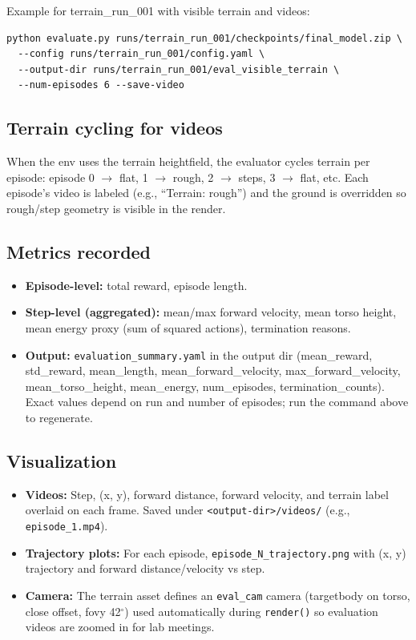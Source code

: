 \documentclass[11pt]{article}
\begin{document}
Example for terrain\_run\_001 with visible terrain and videos:

\begin{lstlisting}
python evaluate.py runs/terrain_run_001/checkpoints/final_model.zip \
  --config runs/terrain_run_001/config.yaml \
  --output-dir runs/terrain_run_001/eval_visible_terrain \
  --num-episodes 6 --save-video
\end{lstlisting}

\subsection{Terrain cycling for videos}

When the env uses the terrain heightfield, the evaluator cycles terrain per episode: episode 0 $\to$ flat, 1 $\to$ rough, 2 $\to$ steps, 3 $\to$ flat, etc. Each episode's video is labeled (e.g., ``Terrain: rough'') and the ground is overridden so rough/step geometry is visible in the render.

\subsection{Metrics recorded}

\begin{itemize}
  \item \textbf{Episode-level:} total reward, episode length.
  \item \textbf{Step-level (aggregated):} mean/max forward velocity, mean torso height, mean energy proxy (sum of squared actions), termination reasons.
  \item \textbf{Output:} \texttt{evaluation\_summary.yaml} in the output dir (mean\_reward, std\_reward, mean\_length, mean\_forward\_velocity, max\_forward\_velocity, mean\_torso\_height, mean\_energy, num\_episodes, termination\_counts). Exact values depend on run and number of episodes; run the command above to regenerate.
\end{itemize}

\subsection{Visualization}

\begin{itemize}
  \item \textbf{Videos:} Step, (x, y), forward distance, forward velocity, and terrain label overlaid on each frame. Saved under \texttt{<output-dir>/videos/} (e.g., \texttt{episode\_1.mp4}).
  \item \textbf{Trajectory plots:} For each episode, \texttt{episode\_N\_trajectory.png} with (x, y) trajectory and forward distance/velocity vs step.
  \item \textbf{Camera:} The terrain asset defines an \texttt{eval\_cam} camera (targetbody on torso, close offset, fovy 42$^\circ$) used automatically during \texttt{render()} so evaluation videos are zoomed in for lab meetings.
\end{itemize}
\end{document}
